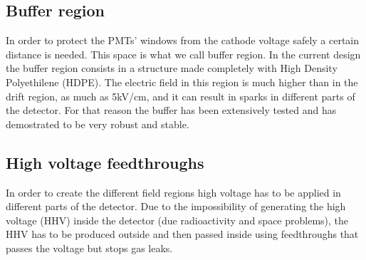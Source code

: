 \subsection{Buffer region}

In order to protect the PMTs' windows from the cathode voltage safely a certain distance is needed. This space is what we call buffer region. In the current design the buffer region consists in a structure made completely with High Density Polyethilene (HDPE). The electric field in this region is much higher than in the drift region, as much as 5kV/cm, and it can result in sparks in different parts of the detector. For that reason the buffer has been extensively tested and has demostrated to be very robust and stable.

%
%
%


\subsection{High voltage feedthroughs}

In order to create the different field regions high voltage has to be applied in different parts of the detector. Due to the impossibility of generating the high voltage (HHV) inside the detector (due radioactivity and space problems), the HHV has to be produced outside and then passed inside using feedthroughs that passes the voltage but stops gas leaks.


